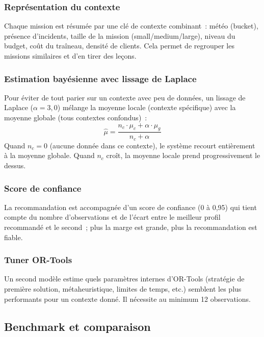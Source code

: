\documentclass[a4paper, 12pt, twoside]{article}
\begin{document}
\subsubsection{Repr\'{e}sentation du contexte}

Chaque mission est r\'{e}sum\'{e}e par une cl\'{e} de contexte combinant~:
m\'{e}t\'{e}o (bucket), pr\'{e}sence d'incidents, taille de la mission (small/medium/large),
niveau du budget, co\^{u}t du tra\^{i}neau, densit\'{e} de clients. Cela permet de regrouper
les missions similaires et d'en tirer des leçons.

\subsubsection{Estimation bay\'{e}sienne avec lissage de Laplace}

Pour \'{e}viter de tout parier sur un contexte avec peu de donn\'{e}es, un lissage de Laplace
($\alpha = 3{,}0$) m\'{e}lange la moyenne locale (contexte sp\'{e}cifique) avec la moyenne
globale (tous contextes confondus)~:
\[
  \hat{\mu} = \frac{n_c \cdot \mu_c + \alpha \cdot \mu_g}{n_c + \alpha}
\]
Quand $n_c = 0$ (aucune donn\'{e}e dans ce contexte), le syst\`{e}me recourt enti\`{e}rement \`{a}
la moyenne globale. Quand $n_c$ cro\^{i}t, la moyenne locale prend progressivement le dessus.

\subsubsection{Score de confiance}

La recommandation est accompagn\'{e}e d'un score de confiance (0 \`{a} 0,95) qui tient compte
du nombre d'observations et de l'\'{e}cart entre le meilleur profil recommand\'{e} et le second~;
plus la marge est grande, plus la recommandation est fiable.

\subsubsection{Tuner OR-Tools}

Un second mod\`{e}le estime quels param\`{e}tres internes d'OR-Tools (strat\'{e}gie de premi\`{e}re
solution, m\'{e}taheuristique, limites de temps, etc.) semblent les plus performants pour un contexte donn\'{e}.
Il n\'{e}cessite au minimum 12 observations.

\subsection{Benchmark et comparaison}
\end{document}
